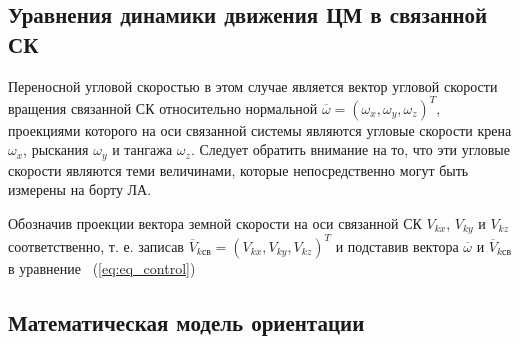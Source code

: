 \subsection{Уравнения динамики движения ЦМ в связанной СК}

Переносной угловой скоростью в этом случае является вектор угловой скорости вращения связанной СК относительно нормальной $\overline{\omega} = (\omega_x, \omega_y, \omega_z)^T$, проекциями которого на оси связанной системы являются угловые скорости крена $\omega_x$, рыскания $\omega_y$ и тангажа $\omega_z$. Следует обратить внимание на то, что эти угловые скорости являются теми величинами, которые непосредственно могут быть измерены на борту ЛА.

Обозначив проекции вектора земной скорости на оси связанной СК $V_{kx}$, $V_{ky}$ и $V_{kz}$ соответственно, т. е. записав $\overline{V}_{k\text{св}} = (V_{kx}, V_{ky}, V_{kz})^T$ и подставив вектора $\overline{\omega}$ и $\overline{V}_{k\text{св}}$ в уравнение ~(\ref{eq:eq_control})
\clearpage

\subsection{Математическая модель ориентации}
\clearpage